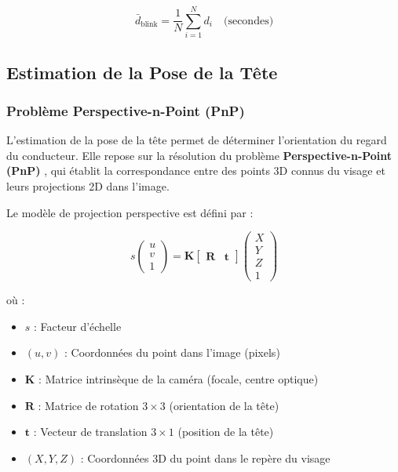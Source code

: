 \documentclass[12pt,a4paper,twoside]{report}
\newcommand{\keyword}[1]{\textbf{\textcolor{stellantisblue}{#1}}}
\begin{document}
\begin{equation}
\bar{d}_{\text{blink}} = \frac{1}{N} \sum_{i=1}^{N} d_i \quad \text{(secondes)}
\label{eq:blink_duration}
\end{equation}

\subsection{Estimation de la Pose de la Tête}

\subsubsection{Problème Perspective-n-Point (PnP)}

L'estimation de la pose de la tête permet de déterminer l'orientation du regard du conducteur. Elle repose sur la résolution du problème \keyword{Perspective-n-Point (PnP)} \cite{lepetit2009}, qui établit la correspondance entre des points 3D connus du visage et leurs projections 2D dans l'image.

Le modèle de projection perspective est défini par :

\begin{equation}
\boxed{
s \begin{pmatrix} u \\ v \\ 1 \end{pmatrix} = \mathbf{K} \begin{bmatrix} \mathbf{R} & \mathbf{t} \end{bmatrix} \begin{pmatrix} X \\ Y \\ Z \\ 1 \end{pmatrix}
}
\label{eq:pnp}
\end{equation}

où :
\begin{itemize}
    \item $s$ : Facteur d'échelle
    \item $(u, v)$ : Coordonnées du point dans l'image (pixels)
    \item $\mathbf{K}$ : Matrice intrinsèque de la caméra (focale, centre optique)
    \item $\mathbf{R}$ : Matrice de rotation $3 \times 3$ (orientation de la tête)
    \item $\mathbf{t}$ : Vecteur de translation $3 \times 1$ (position de la tête)
    \item $(X, Y, Z)$ : Coordonnées 3D du point dans le repère du visage
\end{itemize}
\end{document}
